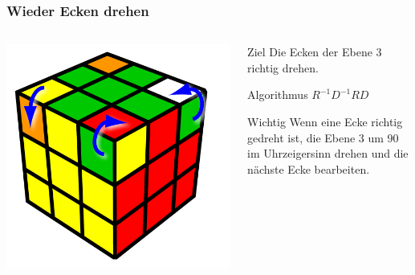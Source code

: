 \begin{frame}
	\frametitle{Wieder Ecken drehen}
	
	\begin{columns}[c]
		\begin{column}[C]{.5\textwidth}
			\center
			\includegraphics[scale=0.3]{img/layer3edges3}
		\end{column}
		\begin{column}[C]{.5\textwidth}
			\begin{block}{Ziel}
				Die Ecken der Ebene 3 richtig drehen.
			\end{block}
			\begin{exampleblock}{Algorithmus}
				$R^{-1}D^{-1}RD$
			\end{exampleblock}
			\begin{alertblock}{Wichtig}
				Wenn eine Ecke richtig gedreht ist, die Ebene 3 um 90\gradneu{} im Uhrzeigersinn drehen und die nächste Ecke bearbeiten.
			\end{alertblock}
		\end{column}
	\end{columns}
	
\end{frame}

